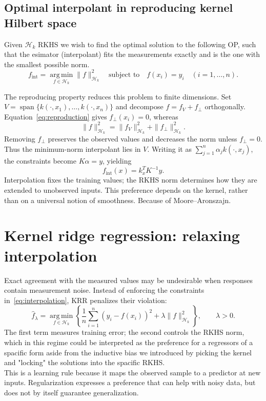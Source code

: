 \documentclass[10pt,a4paper]{article}
\newcommand{\Hk}{\mathcal H_k}
\begin{document}
\subsection{Optimal interpolant in reproducing kernel Hilbert space}
Given $\Hk$ RKHS we wish to find the optimal solution to the following OP, such that the esimator (interpolant) fits the measurements exactly and is the one with the smallest possible norm.
\begin{equation}
	f_{\mathrm{int}}=\operatorname*{arg\,min}_{f\in\Hk}\|f\|_{\Hk}^2
	\quad\text{subject to}\quad f(x_i)=y_i\quad(i=1,\ldots,n).
	\label{eq:interpolation}
\end{equation}

The reproducing property reduces this problem to finite dimensions. Set
$V=\operatorname{span}\{k(\cdot,x_1),\ldots,k(\cdot,x_n)\}$ and decompose $f=f_V+f_\perp$ orthogonally. Equation~\eqref{eq:reproduction} gives $f_\perp(x_i)=0$, whereas
\begin{equation}
	\|f\|_{\Hk}^2=\|f_V\|_{\Hk}^2+\|f_\perp\|_{\Hk}^2.
	\label{eq:split}
\end{equation}
Removing $f_\perp$ preserves the observed values and decreases the norm unless $f_\perp=0$. Thus the minimum-norm interpolant lies in $V$. Writing it as $\sum_{j=1}^n\alpha_j k(\cdot,x_j)$, the constraints become $K\alpha=y$, yielding
\begin{equation}
	\boxed{f_{\mathrm{int}}(x)=k_x^TK^{-1}y.}
	\label{eq:interpolant}
\end{equation}
Interpolation fixes the training values; the RKHS norm determines how they are extended to unobserved inputs. This preference depends on the kernel, rather than on a universal notion of smoothness.
Because of Moore–Aronszajn.

\section{Kernel ridge regression: relaxing interpolation}
Exact agreement with the measured values may be undesirable when responses contain measurement noise. Instead of enforcing the constraints in~\eqref{eq:interpolation}, KRR penalizes their violation:
\begin{equation}
	\widehat f_\lambda=\operatorname*{arg\,min}_{f\in\Hk}
	\left\{\frac1n\sum_{i=1}^n(y_i-f(x_i))^2+\lambda\|f\|_{\Hk}^2\right\},
	\qquad\lambda>0.
	\label{eq:krr}
\end{equation}
The first term measures training error; the second controls the RKHS norm, which in this regime could be interpreted as the preference for a regressors of a
spacific form aside
from the inductive bias we introduced by picking the kernel and "locking" the solutions into the spacific RKHS.\\
This is a learning rule because it maps the observed sample to a predictor at new inputs. Regularization expresses a preference that can help with noisy data,
but does not by itself guarantee generalization.
\end{document}
